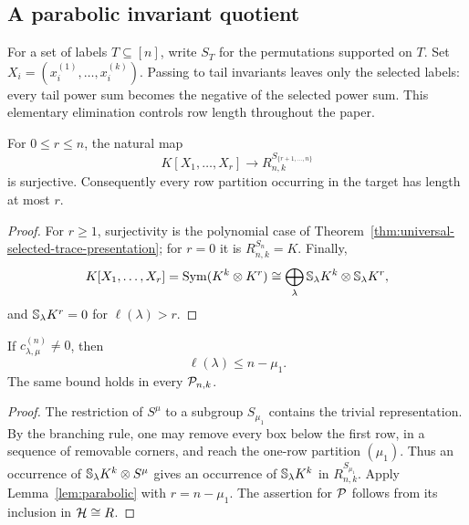 \subsection{A parabolic invariant quotient}

For a set of labels $T\subseteq[n]$, write $S_T$ for the
permutations supported on $T$.  Set
$X_i=(x_i^{(1)},\ldots,x_i^{(k)})$.
Passing to tail invariants leaves only the selected labels:
every tail power sum becomes the negative of the selected power
sum.  This elementary elimination controls row length throughout
the paper.

\begin{lemma}\label{lem:parabolic}
For $0\leq r\leq n$, the natural map
\[
 K[X_1,\ldots,X_r]\longrightarrow R_{n,k}^{S_{\{r+1,\ldots,n\}}}
\]
is surjective.  Consequently every row partition occurring
in the target has length at most $r$.
\end{lemma}

\begin{proof}
For $r\ge1$, surjectivity is the polynomial case of
Theorem~\ref{thm:universal-selected-trace-presentation}; for $r=0$
it is $R_{n,k}^{S_n}=K$.  Finally,
\[
 K[X_1,\ldots,X_r]
  =\operatorname{Sym}(K^k\otimes K^r)
  \cong\bigoplus_\lambda
       \mathbb S_\lambda K^k\otimes\mathbb S_\lambda K^r,
\]
and $\mathbb S_\lambda K^r=0$ for $\ell(\lambda)>r$.
\end{proof}

\begin{proposition}\label{prop:length-upper}
If $c_{\lambda,\mu}^{(n)}\ne0$, then
\[
 \ell(\lambda)\leq n-\mu_1.
\]
The same bound holds in every $\mathcal P_{n,k}$.
\end{proposition}

\begin{proof}
The restriction of $S^\mu$ to a subgroup $S_{\mu_1}$ contains
the trivial representation.  By the branching rule, one may
remove every box below the first row, in a sequence of removable
corners, and reach the one-row partition $(\mu_1)$.
Thus an occurrence of $\mathbb S_\lambda K^k\otimes S^\mu$
gives an occurrence of $\mathbb S_\lambda K^k$ in
$R_{n,k}^{S_{\mu_1}}$.
Apply Lemma~\ref{lem:parabolic} with $r=n-\mu_1$.
The assertion for $\mathcal P$ follows from its inclusion in
$\mathcal H\cong R$.
\end{proof}

